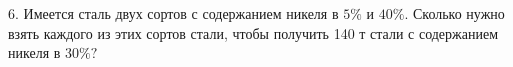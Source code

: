 6. Имеется сталь двух сортов с содержанием никеля в $5\%$ и $40\%.$ Сколько нужно взять каждого из этих сортов стали, чтобы получить 140 т стали с содержанием никеля в $30\%?$\\
